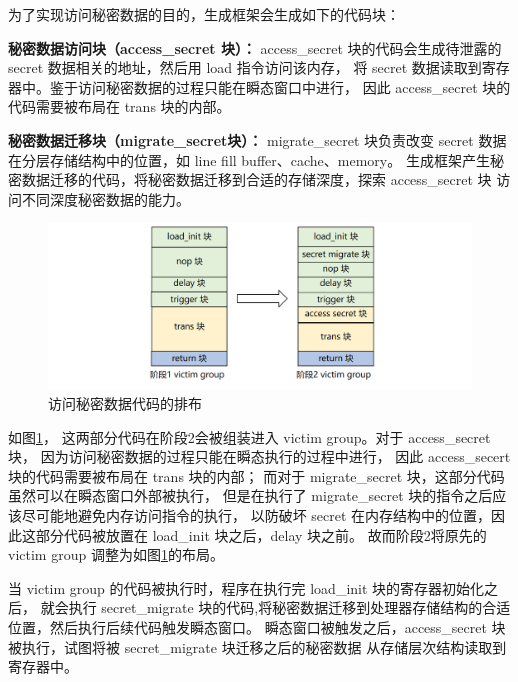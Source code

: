 为了实现访问秘密数据的目的，生成框架会生成如下的代码块：\par

\textbf{秘密数据访问块（access\_secret 块）：}
access\_secret 块的代码会生成待泄露的 secret 数据相关的地址，然后用 load 指令访问该内存，
将 secret 数据读取到寄存器中。鉴于访问秘密数据的过程只能在瞬态窗口中进行，
因此 access\_secret 块的代码需要被布局在 trans 块的内部。\par

\textbf{秘密数据迁移块（migrate\_secret块）：}
migrate\_secret 块负责改变 secret 数据在分层存储结构中的位置，如 line fill buffer、cache、memory。
生成框架产生秘密数据迁移的代码，将秘密数据迁移到合适的存储深度，探索 access\_secret 块
访问不同深度秘密数据的能力。\par

\begin{figure}[!h]
    \centering
    \includegraphics[width=\linewidth]{figure/paper/stage2-access-secret.png}
    \caption{访问秘密数据代码的排布}
    \label{paper:access-secret}
\end{figure}

如图\ref{paper:access-secret}，
这两部分代码在阶段2会被组装进入 victim group。对于 access\_secret 块，
因为访问秘密数据的过程只能在瞬态执行的过程中进行，
因此 access\_secert 块的代码需要被布局在 trans 块的内部；
而对于 migrate\_secret 块，这部分代码虽然可以在瞬态窗口外部被执行，
但是在执行了 migrate\_secret 块的指令之后应该尽可能地避免内存访问指令的执行，
以防破坏 secret 在内存结构中的位置，因此这部分代码被放置在 load\_init 块之后，delay 块之前。
故而阶段2将原先的 victim group 调整为如图\ref{paper:access-secret}的布局。\par

当 victim group 的代码被执行时，程序在执行完 load\_init 块的寄存器初始化之后，
就会执行 secret\_migrate 块的代码,将秘密数据迁移到处理器存储结构的合适位置，然后执行后续代码触发瞬态窗口。
瞬态窗口被触发之后，access\_secret 块被执行，试图将被 secret\_migrate 块迁移之后的秘密数据
从存储层次结构读取到寄存器中。\par

